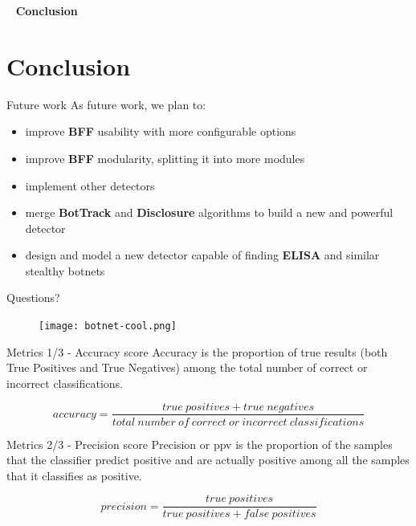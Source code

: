 \documentclass{beamer}
\begin{document}
	\begin{frame}{\ }
		\Huge \textbf{Conclusion}
	\end{frame}
	
	\section{Conclusion}
	
	\begin{frame}{Future work}
		As future work, we plan to:
		\begin{itemize}
			\item improve \textbf{BFF} usability with more configurable options
			\item improve \textbf{BFF} modularity, splitting it into more modules
			\item implement other detectors
			\item merge \textbf{BotTrack} and \textbf{Disclosure} algorithms to build a new and powerful detector
			\item design and model a new detector capable of finding \textbf{ELISA} and similar stealthy botnets
		\end{itemize}
	\end{frame}

	\begin{frame}{Questions?}
		\begin{figure}
			\texttt{[image: botnet-cool.png]}
		\end{figure}
	\end{frame}
	
	\appendix
	
	\subtitle{a modular framework for botnet detectors evaluation and a practical application (backup slides)}
	\maketitle
	
	\begin{frame}{Metrics 1/3 - Accuracy score}
		Accuracy is the proportion of true results (both True Positives and True Negatives) among the total number of correct or incorrect classifications.
		
		$$accuracy=\frac{true\ positives + true\ negatives} {total\ number\ of\ correct\ or\ incorrect\ classifications}$$
	\end{frame}
	
	\begin{frame}{Metrics 2/3 - Precision score}
		Precision or \acrfull{ppv} is the proportion of the samples that the classifier predict positive and are actually positive among all the samples that it classifies as positive.
		
		$$precision=\frac{true\ positives}{true\ positives + false\ positives}$$
	\end{frame}
	
\end{document}
